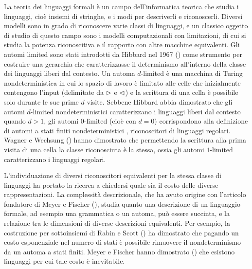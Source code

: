 \preface
La teoria dei linguaggi formali è un campo dell'informatica teorica che studia i linguaggi, cioè insiemi di stringhe, e i modi per descriverli e riconoscerli. Diversi modelli sono in grado di riconoscere varie classi di linguaggi, e un classico oggetto di studio di questo campo sono i modelli computazionali con limitazioni, di cui si studia la potenza riconoscitiva e il rapporto con altre macchine equivalenti. Gli automi limited sono stati introdotti da Hibbard nel 1967 (\cite{Hibbard:67:CFdet}) come strumento per costruire una gerarchia che caratterizzasse il determinismo all'interno della classe dei linguaggi liberi dal contesto.
Un automa $d$-limited è una macchina di Turing nondeterministica in cui lo spazio di lavoro è limitato alle celle che inizialmente contengono l'input (delimitate da $\rhd$ e $\lhd$) e la scrittura di una cella è possibile solo durante le sue prime $d$ visite. Sebbene Hibbard abbia dimostrato che gli automi $d$-limited nondeterministici caratterizzano i linguaggi liberi dal contesto quando $d>1$, gli automi $0$-limited (cioè con $d=0$) corrispondono alla definizione di automi a stati finiti nondeterministici , riconoscitori di linguaggi regolari. Wagner e Wechsung (\cite{Wagner:86:compCompl}) hanno dimostrato che permettendo la scrittura alla prima visita di una cella la classe riconosciuta è la stessa, ossia gli automi $1$-limited caratterizzano i linguaggi regolari.

L'individuazione di diversi riconoscitori equivalenti per la stessa classe di linguaggi ha portato la ricerca a chiedersi quale sia il costo delle diverse rappresentazioni. La complessità descrizionale, che ha avuto origine con l'articolo fondatore di Meyer e Fischer (\cite{Meyer:71:ecodescription}), studia quanto una descrizione di un linguaggio formale, ad esempio una grammatica o un automa, può essere succinta, e la relazione tra le dimensioni di diverse descrizioni equivalenti. Per esempio, la costruzione per sottoinsiemi di Rabin e Scott (\cite{Rabin:59:NFA}) ha dimostrato che pagando un costo esponenziale nel numero di stati è possibile rimuovere il nondeterminismo da un automa a stati finiti. Meyer e Fischer hanno dimostrato (\cite{Meyer:71:ecodescription}) che esistono linguaggi per cui tale costo è inevitabile.


